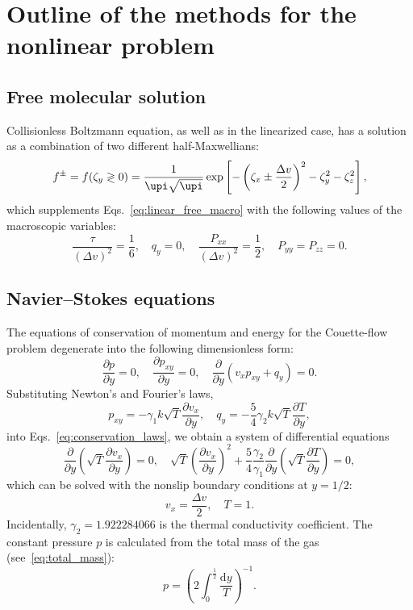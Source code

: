 \documentclass[]{jfm}
\newcommand{\dd}{\mathrm{d}}
\newcommand{\pder}[2][]{\frac{\partial#1}{\partial#2}}
\begin{document}
\section{Outline of the methods for the nonlinear problem}

\subsection{Free molecular solution}

Collisionless Boltzmann equation, as well as in the linearized case,
has a solution as a combination of two different half-Maxwellians:
\begin{equation}\label{eq:free_solution}
    f^\pm = f(\zeta_y \gtrless 0) =
        \frac1{\upi\sqrt{\upi}} \exp\left[-\left(\zeta_x\pm\frac{\Delta{v}}2\right)^2 - \zeta_y^2 - \zeta_z^2\right],
\end{equation}
which supplements Eqs.~\eqref{eq:linear_free_macro} with the following values of the macroscopic variables:
\begin{equation}\label{eq:free_macro}
    \frac{\tau}{(\Delta{v})^2} = \frac16, \quad q_y = 0, \quad
    \frac{P_{xx}}{(\Delta{v})^2} = \frac12, \quad P_{yy} = P_{zz} = 0.
\end{equation}

\subsection{Navier--Stokes equations}\label{sec:Navier-Stokes}

The equations of conservation of momentum and energy for the Couette-flow problem
degenerate into the following dimensionless form:
\begin{equation}\label{eq:conservation_laws}
    \pder[p]{y} = 0, \quad \pder[p_{xy}]{y} = 0, \quad \pder{y}(v_x p_{xy} + q_y) = 0.
\end{equation}
Substituting Newton's and Fourier's laws,
\begin{equation}\label{eq:Newton-Fourier}
    p_{xy} = -\gamma_1 k\sqrt{T}\pder[v_x]{y}, \quad q_y = -\frac54\gamma_2 k\sqrt{T}\pder[T]{y},
\end{equation}
into Eqs.~\eqref{eq:conservation_laws}, we obtain a system of differential equations
\begin{equation}\label{eq:Navier-Stokes}
    \pder{y}\left(\sqrt{T}\pder[v_x]{y}\right) = 0, \quad
    \sqrt{T}\left(\pder[v_x]{y}\right)^2 + \frac54\frac{\gamma_2}{\gamma_1}\pder{y}\left(\sqrt{T}\pder[T]{y}\right) = 0,
\end{equation}
which can be solved with the nonslip boundary conditions at \(y=1/2\):
\begin{equation}\label{eq:nonslip_bc}
    v_x = \frac{\Delta{v}}2, \quad T = 1.
\end{equation}
Incidentally, \(\gamma_2 = 1.922284066\) is the thermal conductivity coefficient.
The constant pressure \(p\) is calculated from the total mass of the gas (see~\eqref{eq:total_mass}):
\begin{equation}\label{eq:constant_pressure}
    p = \left( 2\int_{0}^\frac12\frac{\dd{y}}{T} \right)^{-1}.
\end{equation}
\end{document}
